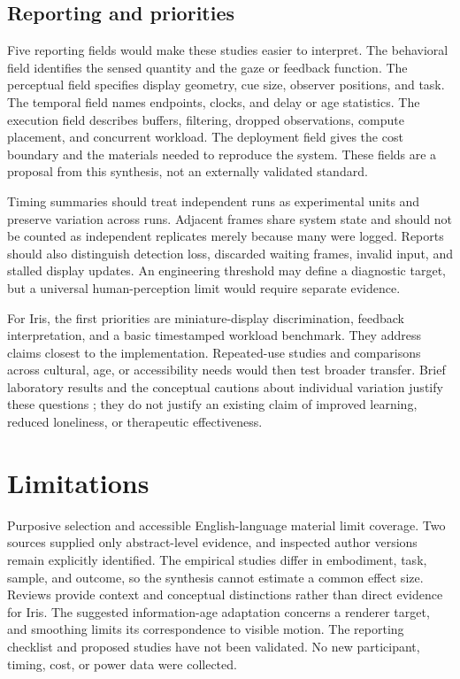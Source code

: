 \documentclass[journal]{IEEEtran}
\begin{document}
\subsection{Reporting and priorities}
Five reporting fields would make these studies easier to interpret. The behavioral field identifies the sensed quantity and the gaze or feedback function. The perceptual field specifies display geometry, cue size, observer positions, and task. The temporal field names endpoints, clocks, and delay or age statistics. The execution field describes buffers, filtering, dropped observations, compute placement, and concurrent workload. The deployment field gives the cost boundary and the materials needed to reproduce the system. These fields are a proposal from this synthesis, not an externally validated standard.

Timing summaries should treat independent runs as experimental units and preserve variation across runs. Adjacent frames share system state and should not be counted as independent replicates merely because many were logged. Reports should also distinguish detection loss, discarded waiting frames, invalid input, and stalled display updates. An engineering threshold may define a diagnostic target, but a universal human-perception limit would require separate evidence.

For Iris, the first priorities are miniature-display discrimination, feedback interpretation, and a basic timestamped workload benchmark. They address claims closest to the implementation. Repeated-use studies and comparisons across cultural, age, or accessibility needs would then test broader transfer. Brief laboratory results and the conceptual cautions about individual variation justify these questions \cite{mirror2025,kang2026,hessels2026}; they do not justify an existing claim of improved learning, reduced loneliness, or therapeutic effectiveness.

\section{Limitations}
Purposive selection and accessible English-language material limit coverage. Two sources supplied only abstract-level evidence, and inspected author versions remain explicitly identified. The empirical studies differ in embodiment, task, sample, and outcome, so the synthesis cannot estimate a common effect size. Reviews provide context and conceptual distinctions rather than direct evidence for Iris. The suggested information-age adaptation concerns a renderer target, and smoothing limits its correspondence to visible motion. The reporting checklist and proposed studies have not been validated. No new participant, timing, cost, or power data were collected.
\end{document}
